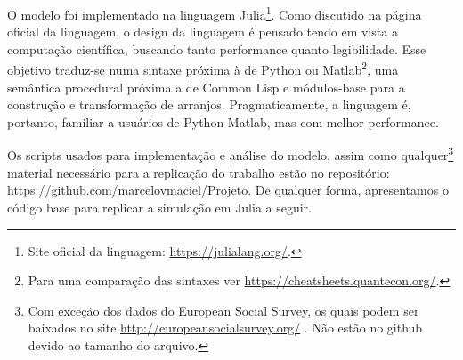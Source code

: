 O modelo foi implementado na linguagem Julia\footnote{Site oficial da linguagem:
\url{https://julialang.org/}.}. Como discutido na página oficial da linguagem, o
design da linguagem é pensado tendo em vista a computação científica, buscando
tanto performance quanto legibilidade. Esse objetivo traduz-se numa sintaxe
próxima à de Python ou Matlab\footnote{Para uma comparação das sintaxes ver
\url{https://cheatsheets.quantecon.org/}.}, uma semântica procedural próxima a
de Common Lisp e módulos-base  para a construção e transformação de
arranjos. Pragmaticamente, a linguagem é, portanto, familiar a usuários de
Python-Matlab, mas com melhor performance.

Os scripts usados para implementação e análise do modelo, assim como
qualquer\footnote{Com exceção dos dados do European Social Survey, os quais
podem ser baixados no site \url{http://europeansocialsurvey.org/} . Não estão no
github devido ao tamanho do arquivo.} material necessário para a replicação do
trabalho estão no repositório: \url{https://github.com/marcelovmaciel/Projeto}.
De qualquer forma, apresentamos o código base para replicar a simulação em Julia a seguir.


